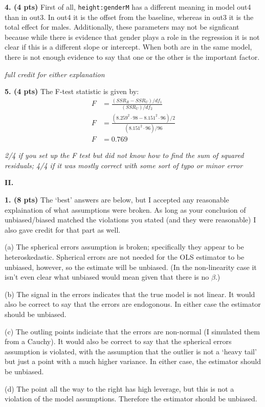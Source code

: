 \documentclass[12pt]{article}
\begin{document}
{\bf 4. (4 pts)} First of all, \texttt{height:genderM} has a different meaning in model out4 than
in out3. In out4 it is the offset from the baseline, whereas in out3 it is the total effect
for males. Additionally, these parameters may not be signficant because while there is evidence
that gender plays a role in the regression it is not clear if this is a different slope or
intercept. When both are in the same model, there is not enough evidence to say that one
or the other is the important factor.

{\it full credit for either explanation}

{\bf 5. (4 pts)} The F-test statistic is given by:
\begin{align*}
F &= \frac{(SSR_{R} - SSR_{U}) / df_1}{(SSR_U) / df_2} \\
F &= \frac{(8.259^2 \cdot 98 - 8.151^2 \cdot 96) / 2}{(8.151^2 \cdot 96) / 96} \\
F &= 0.769
\end{align*}

{\it 2/4 if you set up the F test but did not know how to find the sum of squared
residuals; 4/4 if it was mostly correct with some sort of typo or minor error}

{\bf II.}

{\bf 1. (8 pts)} The `best' answers are below, but I accepted any reasonable explaination
of what assumptions were broken. As long as your conclusion of unbiased/biased matched
the violations you stated (and they were reasonable) I also gave credit for that
part as well.

(a) The spherical errors assumption is broken; specifically they appear
to be heteroskedastic. Spherical errors are not needed for the OLS estimator to
be unbiased, however, so the estimate will be unbiased. (In the non-linearity
case it isn't even clear what unbiased would mean given that there is no
$\beta$.)

(b) The signal in the errors indicates that the true model is not linear. It would
also be correct to say that the errors are endogonous. In either case the estimator
should be unbiased.

(c) The outling points indiciate that the errors are non-normal (I simulated them
from a Cauchy). It would also be correct to say that the spherical errors assumption
is violated, with the assumption that the outlier is not a `heavy tail' but just a
point with a much higher variance. In either case, the estimator should be unbiased.

(d) The point all the way to the right has high leverage, but this is not a violation
of the model assumptions. Therefore the estimator should be unbiased.
\end{document}

